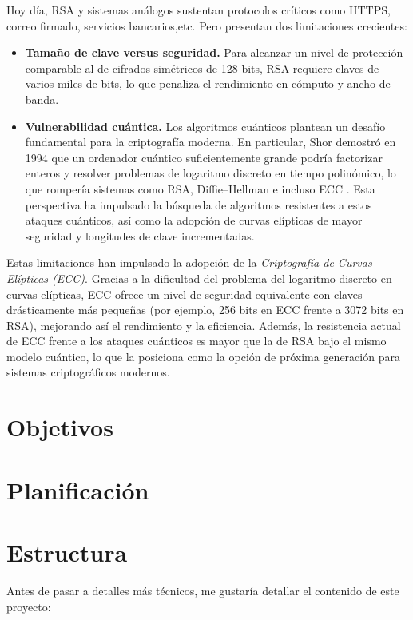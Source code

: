 Hoy día, RSA y sistemas análogos sustentan protocolos críticos como HTTPS, correo firmado, servicios bancarios,etc. Pero presentan dos limitaciones crecientes:  
\begin{itemize}  
  \item \textbf{Tamaño de clave versus seguridad.} Para alcanzar un nivel de protección comparable al de cifrados simétricos de 128 bits, RSA requiere claves de varios miles de bits, lo que penaliza el rendimiento en cómputo y ancho de banda.  
  \item \textbf{Vulnerabilidad cuántica.} 
  Los algoritmos cuánticos plantean un desafío fundamental para la criptografía moderna. En particular, Shor demostró en 1994 que un ordenador cuántico suficientemente grande podría factorizar enteros y resolver problemas de logaritmo discreto en tiempo polinómico, lo que rompería sistemas como RSA, Diffie–Hellman e incluso ECC \cite{shors_algorithm_a_quantum_threat_to_modern_cryptography}\cite{the_quantum_computing_threat}. Esta perspectiva ha impulsado la búsqueda de algoritmos resistentes a estos ataques cuánticos, así como la adopción de curvas elípticas de mayor seguridad y longitudes de clave incrementadas.  
\end{itemize}  

Estas limitaciones han impulsado la adopción de la \emph{Criptografía de Curvas Elípticas (ECC)}. Gracias a la dificultad del problema del logaritmo discreto en curvas elípticas, ECC ofrece un nivel de seguridad equivalente con claves drásticamente más pequeñas (por ejemplo, 256 bits en ECC frente a 3072 bits en RSA), mejorando así el rendimiento y la eficiencia. Además, la resistencia actual de ECC frente a los ataques cuánticos es mayor que la de RSA bajo el mismo modelo cuántico, lo que la posiciona como la opción de próxima generación para sistemas criptográficos modernos.

\section{Objetivos}

\section{Planificación}

\section{Estructura}
Antes de pasar a detalles más técnicos, me gustaría detallar el contenido
de este proyecto:

